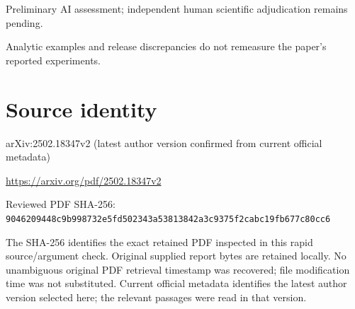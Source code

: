 \documentclass[11pt]{article}
\begin{document}
Preliminary AI assessment; independent human scientific adjudication remains pending.\par

Analytic examples and release discrepancies do not remeasure the paper’s reported experiments.\par

\section*{Source identity}

arXiv:2502.18347v2 (latest author version confirmed from current official metadata)

\url{https://arxiv.org/pdf/2502.18347v2}

Reviewed PDF SHA-256: \nolinkurl{9046209448c9b998732e5fd502343a53813842a3c9375f2cabc19fb677c80cc6}

The SHA-256 identifies the exact retained PDF inspected in this rapid source/argument check. Original supplied report bytes are retained locally. No unambiguous original PDF retrieval timestamp was recovered; file modification time was not substituted. Current official metadata identifies the latest author version selected here; the relevant passages were read in that version.
\end{document}
